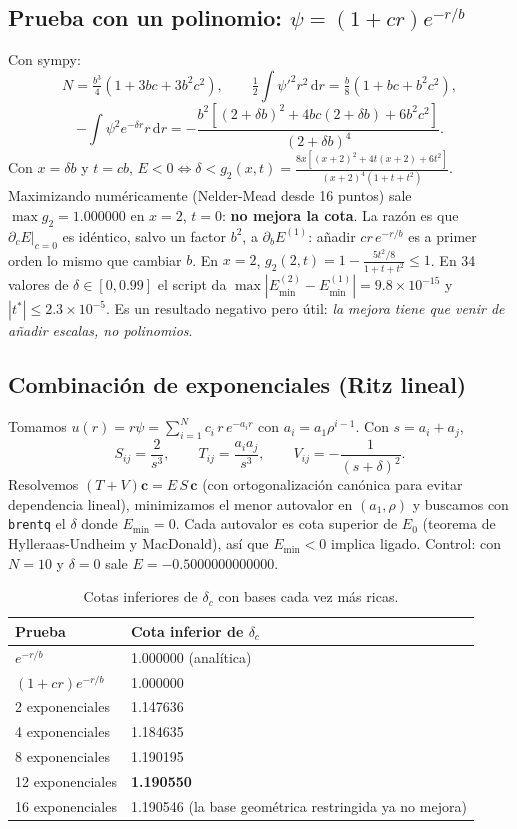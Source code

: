 \documentclass[11pt]{article}
\newcommand{\dd}{\mathrm{d}}
\newcommand{\dc}{\delta_c}
\begin{document}
\subsection{Prueba con un polinomio: $\psi=(1+cr)e^{-r/b}$}

Con sympy:
\[
N=\tfrac{b^3}{4}(1+3bc+3b^2c^2),\qquad\tfrac12\!\int\!\psi'^2r^2\,\dd r=\tfrac b8(1+bc+b^2c^2),
\]
\[
-\!\int\!\psi^2e^{-\delta r}r\,\dd r=-\frac{b^2\left[(2+\delta b)^2+4bc(2+\delta b)+6b^2c^2\right]}{(2+\delta b)^4}.
\]
Con $x=\delta b$ y $t=cb$, $E<0\iff\delta<g_2(x,t)=\frac{8x\left[(x+2)^2+4t(x+2)+6t^2\right]}{(x+2)^4(1+t+t^2)}$. Maximizando numéricamente (Nelder-Mead desde 16 puntos) sale $\max g_2=1.000000$ en $x=2$, $t=0$: \textbf{no mejora la cota}. La razón es que $\partial_cE|_{c=0}$ es idéntico, salvo un factor $b^2$, a $\partial_bE^{(1)}$: añadir $cr\,e^{-r/b}$ es a primer orden lo mismo que cambiar $b$. En $x=2$, $g_2(2,t)=1-\frac{5t^2/8}{1+t+t^2}\le1$. En 34 valores de $\delta\in[0,0.99]$ el script da $\max|E^{(2)}_{\min}-E^{(1)}_{\min}|=9.8\times10^{-15}$ y $|t^*|\le2.3\times10^{-5}$. Es un resultado negativo pero útil: \emph{la mejora tiene que venir de añadir escalas, no polinomios}.

\subsection{Combinación de exponenciales (Ritz lineal)}

Tomamos $u(r)=r\psi=\sum_{i=1}^Nc_i\,r\,e^{-a_ir}$ con $a_i=a_1\rho^{i-1}$. Con $s=a_i+a_j$,
\[
S_{ij}=\frac{2}{s^3},\qquad T_{ij}=\frac{a_ia_j}{s^3},\qquad V_{ij}=-\frac{1}{(s+\delta)^2}.
\]
Resolvemos $(T+V)\mathbf c=E\,S\,\mathbf c$ (con ortogonalización canónica para evitar dependencia lineal), minimizamos el menor autovalor en $(a_1,\rho)$ y buscamos con \texttt{brentq} el $\delta$ donde $E_{\min}=0$. Cada autovalor es cota superior de $E_0$ (teorema de Hylleraas-Undheim y MacDonald), así que $E_{\min}<0$ implica ligado. Control: con $N=10$ y $\delta=0$ sale $E=-0.5000000000000$.

\begin{table}[H]
\centering
\small
\caption{Cotas inferiores de $\dc$ con bases cada vez más ricas.}
\begin{tabular}{@{}ll@{}}
\toprule
\textbf{Prueba} & \textbf{Cota inferior de $\dc$}\\
\midrule
$e^{-r/b}$ & 1.000000 (analítica)\\
$(1+cr)e^{-r/b}$ & 1.000000\\
2 exponenciales & 1.147636\\
4 exponenciales & 1.184635\\
8 exponenciales & 1.190195\\
12 exponenciales & \textbf{1.190550}\\
16 exponenciales & 1.190546 (la base geométrica restringida ya no mejora)\\
\bottomrule
\end{tabular}
\end{table}
\end{document}

